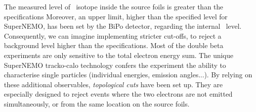 The measured level of \Tl\ isotope inside the source foils is greater than the specifications
Moreover, an upper limit, higher than the specified level for SuperNEMO, has been set by the BiPo detector, regarding the internal \Bi\ level.
Consequently, we can imagine implementing stricter cut-offs, to reject a background level higher than the specifications.
Most of the double beta experiments are only sensitive to the total electron energy sum.
The unique SuperNEMO tracko-calo technology confers the experiment the ability to characterise single particles (individual energies, emission angles...).
By relying on these additional observables, \emph{topological cuts} have been set up.
They are especially designed to reject events where the two electrons are not emitted simultaneously, or from the same location on the source foils.

